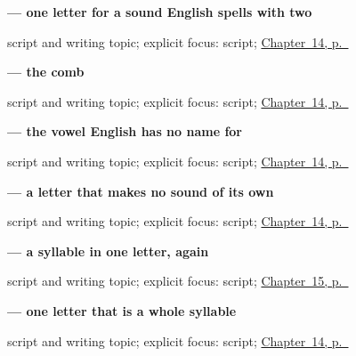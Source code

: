 \noindent\begin{minipage}[t]{\linewidth}
\raggedright
\textbf{ — one letter for a sound English spells with two}\par
\footnotesize script and writing topic; explicit focus: script; \hyperref[ch:ru-script-eleven]{Chapter~14, p.~\pageref*{ch:ru-script-eleven}}
\end{minipage}\par\smallskip

\noindent\begin{minipage}[t]{\linewidth}
\raggedright
\textbf{ — the comb}\par
\footnotesize script and writing topic; explicit focus: script; \hyperref[ch:ru-script-eleven]{Chapter~14, p.~\pageref*{ch:ru-script-eleven}}
\end{minipage}\par\smallskip

\noindent\begin{minipage}[t]{\linewidth}
\raggedright
\textbf{ — the vowel English has no name for}\par
\footnotesize script and writing topic; explicit focus: script; \hyperref[ch:ru-script-eleven]{Chapter~14, p.~\pageref*{ch:ru-script-eleven}}
\end{minipage}\par\smallskip

\noindent\begin{minipage}[t]{\linewidth}
\raggedright
\textbf{ — a letter that makes no sound of its own}\par
\footnotesize script and writing topic; explicit focus: script; \hyperref[ch:ru-script-eleven]{Chapter~14, p.~\pageref*{ch:ru-script-eleven}}
\end{minipage}\par\smallskip

\noindent\begin{minipage}[t]{\linewidth}
\raggedright
\textbf{ — a syllable in one letter, again}\par
\footnotesize script and writing topic; explicit focus: script; \hyperref[ch:ru-script-eight]{Chapter~15, p.~\pageref*{ch:ru-script-eight}}
\end{minipage}\par\smallskip

\noindent\begin{minipage}[t]{\linewidth}
\raggedright
\textbf{ — one letter that is a whole syllable}\par
\footnotesize script and writing topic; explicit focus: script; \hyperref[ch:ru-script-eleven]{Chapter~14, p.~\pageref*{ch:ru-script-eleven}}
\end{minipage}\par\smallskip
